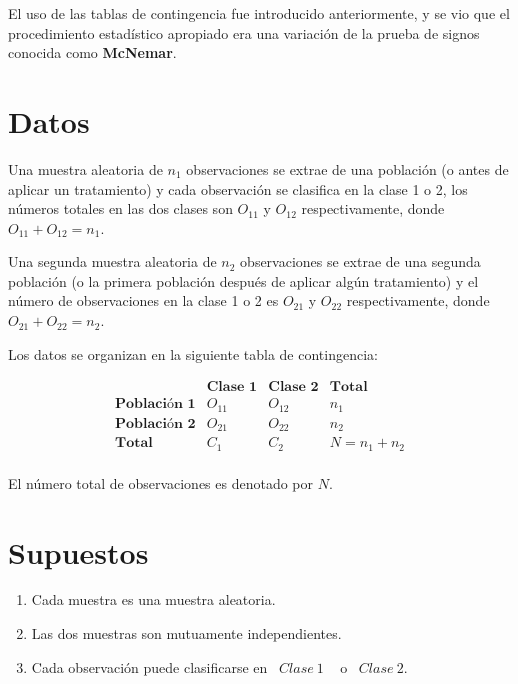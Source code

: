 \documentclass[
  a4paper,
  oneside,
  openany]{book}
\begin{document}
El uso de las tablas de contingencia fue introducido anteriormente, y se vio que el procedimiento estadístico apropiado era una variación de la prueba de signos conocida como \textbf{McNemar}.

\hypertarget{datos-10}{%
\section{Datos}\label{datos-10}}

Una muestra aleatoria de \(n_{1}\) observaciones se extrae de una población (o antes de aplicar un tratamiento) y cada observación se clasifica en la clase 1 o 2, los números totales en las dos clases son \(O_{11}\) y \(O_{12}\) respectivamente, donde \(O_{11} + O_{12}= n_{1}\).

Una segunda muestra aleatoria de \(n_{2}\) observaciones se extrae de una segunda población (o la primera población después de aplicar algún tratamiento) y el número de observaciones en la clase 1 o 2 es \(O_{21}\) y \(O_{22}\) respectivamente, donde \(O_{21} +O_{22}=n_{2}\).

Los datos se organizan en la siguiente tabla de contingencia:

\[
\begin{array}{c|c|c|c}
 & \textbf{Clase 1} & \textbf{Clase 2} & \textbf{Total}     \\
\hline
\textbf{Población 1} & O_{11} & O_{12} & n_{1}   \\
\hline
\textbf{Población 2} & O_{21} & O_{22} & n_{2}\\
\hline
\textbf{Total}       & C_{1} & C_{2}   & N=n_{1}+n_{2} \\
\end{array}
\]

El número total de observaciones es denotado por \(N\).

\hypertarget{supuestos-9}{%
\section{Supuestos}\label{supuestos-9}}

\begin{enumerate}
\def\labelenumi{\arabic{enumi})}
\item
  Cada muestra es una muestra aleatoria.
\item
  Las dos muestras son mutuamente independientes.
\item
  Cada observación puede clasificarse en ~\(Clase\  1\) ~ o ~\(Clase\ 2\).
\end{enumerate}
\end{document}
